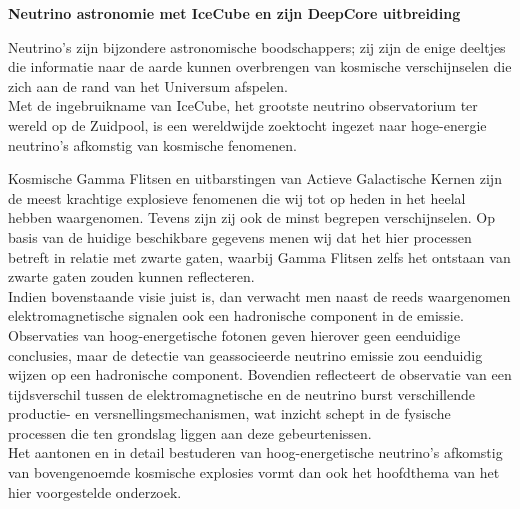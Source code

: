 \documentclass[11pt,a4paper,pdftex]{report}
\begin{document}
\begin{center}
{\bf Neutrino astronomie met IceCube en zijn DeepCore uitbreiding}
\end{center}

Neutrino's zijn bijzondere astronomische boodschappers; zij zijn de enige deeltjes die informatie naar
de aarde kunnen overbrengen van kosmische verschijnselen die zich aan de rand van het Universum afspelen.\\
Met de ingebruikname van IceCube, het grootste neutrino observatorium ter wereld op de Zuidpool,
is een wereldwijde zoektocht ingezet naar hoge-energie neutrino's afkomstig van kosmische fenomenen.

Kosmische Gamma Flitsen en uitbarstingen van Actieve Galactische Kernen zijn de meest krachtige explosieve
fenomenen die wij tot op heden in het heelal hebben waargenomen. Tevens zijn zij ook de minst begrepen
verschijnselen.
Op basis van de huidige beschikbare gegevens menen wij dat het hier processen betreft in relatie met
zwarte gaten, waarbij Gamma Flitsen zelfs het ontstaan van zwarte gaten zouden kunnen reflecteren.\\
Indien bovenstaande visie juist is, dan verwacht men naast de reeds waargenomen elektromagnetische signalen
ook een hadronische component in de emissie. 
Observaties van hoog-energetische fotonen geven hierover geen eenduidige conclusies, maar de detectie van
geassocieerde neutrino emissie zou eenduidig wijzen op een hadronische component.
Bovendien reflecteert de observatie van een tijdsverschil tussen de elektromagnetische en de neutrino burst
verschillende productie- en versnellingsmechanismen, wat inzicht schept in de fysische processen die ten
grondslag liggen aan deze gebeurtenissen.\\
Het aantonen en in detail bestuderen van hoog-energetische neutrino's afkomstig van bovengenoemde kosmische
explosies vormt dan ook het hoofdthema van het hier voorgestelde onderzoek.
\end{document}
